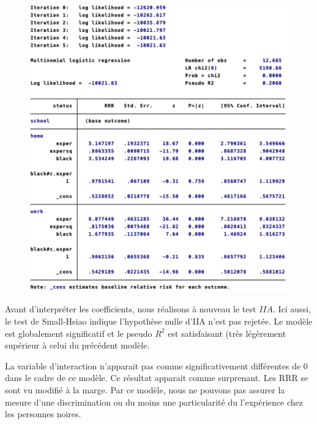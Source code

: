 \begin{figure}
    \includegraphics[scale = 0.55]{100_tab_results/mlogitRRRinteraction.png}
    \centering
\end{figure}



Avant d’interpréter les coefficients, nous réalisons à nouveau le test $IIA$. Ici aussi, le test de Small-Hsiao indique l’hypothèse nulle d’IIA n’est pas rejetée. Le modèle est globalement significatif et le pseudo $R^2$ est satisfaisant (très légèrement supérieur à celui du précédent modèle. 

\vspace*{0.3cm}

La variable d’interaction n’apparait pas comme significativement différentes de 0 dans le cadre de ce modèle. Ce résultat apparait comme surprenant. Les RRR se sont vu modifié à la marge. 
Par ce modèle, nous ne pouvons pas assurer la mesure d’une discrimination ou du moins une particularité du l’expérience chez les personnes noires.




